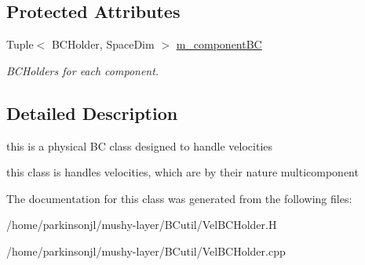 \subsection*{Protected Attributes}
\begin{DoxyCompactItemize}
\item 
\hypertarget{class_vel_b_c_holder_a96bc0178395c31ab7ecc41538f63f457}{Tuple$<$ B\-C\-Holder, Space\-Dim $>$ \hyperlink{class_vel_b_c_holder_a96bc0178395c31ab7ecc41538f63f457}{m\-\_\-component\-B\-C}}\label{class_vel_b_c_holder_a96bc0178395c31ab7ecc41538f63f457}

\begin{DoxyCompactList}\small\item\em B\-C\-Holders for each component. \end{DoxyCompactList}\end{DoxyCompactItemize}


\subsection{Detailed Description}
this is a physical B\-C class designed to handle velocities 

this class is handles velocities, which are by their nature multicomponent 

The documentation for this class was generated from the following files\-:\begin{DoxyCompactItemize}
\item 
/home/parkinsonjl/mushy-\/layer/\-B\-Cutil/Vel\-B\-C\-Holder.\-H\item 
/home/parkinsonjl/mushy-\/layer/\-B\-Cutil/Vel\-B\-C\-Holder.\-cpp\end{DoxyCompactItemize}

